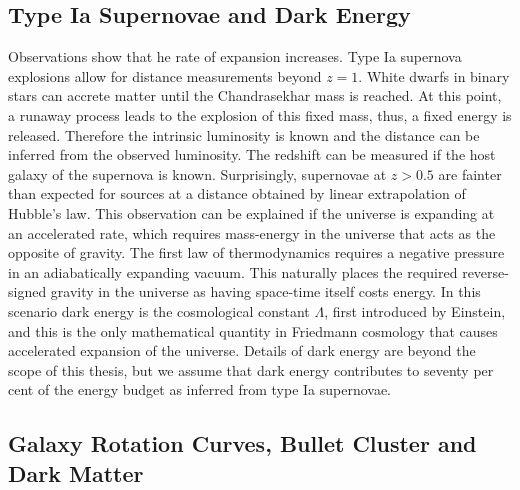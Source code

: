 \documentclass[MScProj_TLRH_ClusterEnergy.tex]{subfiles}
\begin{document}
\subsection*{Type Ia Supernovae and Dark Energy}
\label{sec:darkenergy}

Observations show that he rate of expansion increases. Type Ia supernova 
explosions allow for distance measurements beyond $z=1$. White dwarfs in binary
stars can accrete matter until the Chandrasekhar mass is reached. At this point,
a runaway process leads to the explosion of this fixed mass, thus, a fixed energy
is released. Therefore the intrinsic luminosity is known and the distance can be
inferred from the observed luminosity. The redshift can be measured if the host
galaxy of the supernova is known. Surprisingly, supernovae at $z>0.5$ are fainter
\citep{1998AJ....116.1009R, 1999ApJ...517..565P} than expected for sources at a
distance obtained by linear extrapolation of Hubble's law. This observation can
be explained if the universe is expanding at an accelerated rate, which requires
mass-energy in the universe that acts as the opposite of gravity. The first law
of thermodynamics requires a negative pressure in an adiabatically expanding 
vacuum. This naturally places the required reverse-signed gravity in the universe
as having space-time itself costs energy. In this scenario dark energy is the
cosmological constant $\Lambda$, first introduced by Einstein, and this is the
only mathematical quantity in Friedmann cosmology that causes accelerated expansion
of the universe. Details of dark energy are beyond the scope of this thesis, but
we assume that dark energy contributes to seventy per cent of the energy budget
as inferred from type Ia supernovae.

\subsection*{Galaxy Rotation Curves, Bullet Cluster and Dark Matter}
\label{sec:darkmatter}
\end{document}

